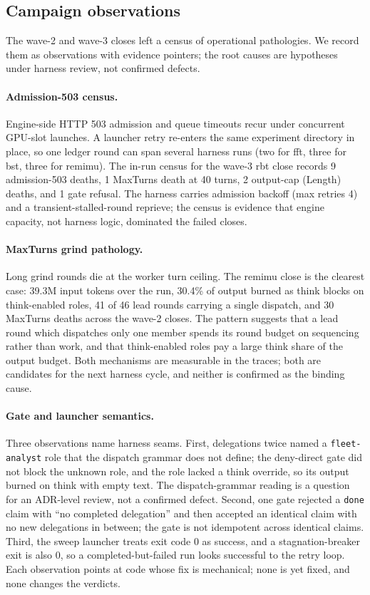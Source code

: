 \documentclass[11pt]{article}
\begin{document}
\subsection{Campaign observations}
\label{sec:observations}

The wave-2 and wave-3 closes left a census of operational pathologies.
We record them as observations with evidence pointers; the root causes
are hypotheses under harness review, not confirmed defects.

\paragraph{Admission-503 census.}
Engine-side HTTP 503 admission and queue timeouts recur under
concurrent GPU-slot launches. A launcher retry re-enters the same
experiment directory in place, so one ledger round can span several
harness runs (two for fft, three for bst, three for remimu). The in-run
census for the wave-3 rbt close records 9 admission-503 deaths, 1
MaxTurns death at 40 turns, 2 output-cap (Length) deaths, and 1 gate
refusal. The harness carries admission backoff (max retries 4) and a
transient-stalled-round reprieve; the census is evidence that engine
capacity, not harness logic, dominated the failed closes.

\paragraph{MaxTurns grind pathology.}
Long grind rounds die at the worker turn ceiling. The remimu close is
the clearest case: 39.3M input tokens over the run, 30.4\% of output
burned as think blocks on think-enabled roles, 41 of 46 lead rounds
carrying a single dispatch, and 30 MaxTurns deaths across the wave-2
closes. The pattern suggests that a lead round which dispatches only one
member spends its round budget on sequencing rather than work, and that
think-enabled roles pay a large think share of the output budget. Both
mechanisms are measurable in the traces; both are candidates for the
next harness cycle, and neither is confirmed as the binding cause.

\paragraph{Gate and launcher semantics.}
Three observations name harness seams. First, delegations twice named a
\texttt{fleet-analyst} role that the dispatch grammar does not define;
the deny-direct gate did not block the unknown role, and the role lacked
a think override, so its output burned on think with empty text. The
dispatch-grammar reading is a question for an ADR-level review, not a
confirmed defect. Second, one gate rejected a \texttt{done} claim with
``no completed delegation'' and then accepted an identical claim with no
new delegations in between; the gate is not idempotent across identical
claims. Third, the sweep launcher treats exit code 0 as success, and a
stagnation-breaker exit is also 0, so a completed-but-failed run looks
successful to the retry loop. Each observation points at code whose fix
is mechanical; none is yet fixed, and none changes the verdicts.
\end{document}
